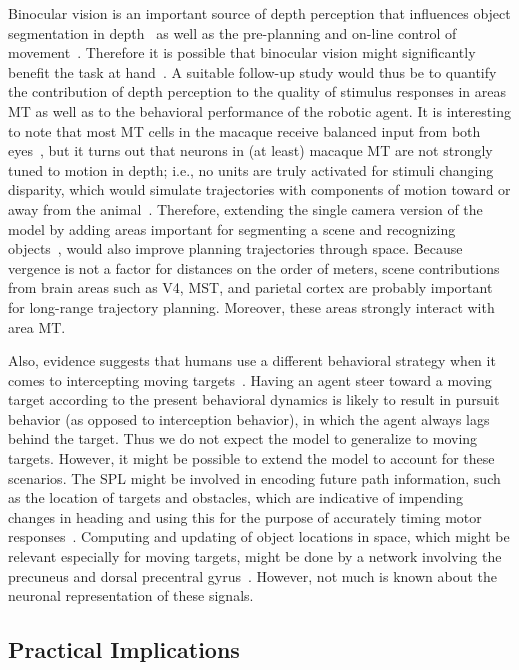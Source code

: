Binocular vision is an important source of depth perception that
influences object segmentation in depth~\citep{Xiao1997}
as well as the pre-planning and on-line control
of movement~\citep{Patla1997}. Therefore it is possible
that binocular vision might significantly benefit the task at 
hand~\citep{Pauwels2010}. A suitable
follow-up study would thus be to quantify the contribution of
depth perception to the quality of stimulus responses in areas
\ac{MT} as well as to the behavioral performance of the robotic agent.
It is interesting to note that most \ac{MT} cells in the macaque
receive balanced input from both eyes~\citep{MaunsellVanEssen1983}, 
but it turns out that neurons in (at least) macaque \ac{MT}
are not strongly tuned to motion in depth; i.e., no units are truly
activated for stimuli changing disparity, which would simulate
trajectories with components of motion toward or away from the
animal~\citep{MaunsellVanEssen1983}. Therefore, extending the
single camera version of the model by adding areas important for
segmenting a scene and recognizing objects~\citep{Baloch1997},
would also improve planning trajectories through space.
Because vergence is not a factor for distances on the order of
meters, scene contributions from brain areas such as V4, \ac{MST}, and
parietal cortex are probably important for long-range trajectory
planning. Moreover, these areas strongly interact with area \ac{MT}.

Also, evidence suggests that humans use a different behavioral
strategy when it comes to intercepting moving 
targets~\citep{FajenWarren2003}.
Having an agent steer toward a moving target
according to the present behavioral dynamics is likely to result in
pursuit behavior (as opposed to interception behavior), in which
the agent always lags behind the target. Thus we do not expect
the model to generalize to moving targets. However, it might
be possible to extend the model to account for these scenarios.
The \ac{SPL} might be involved in encoding
future path information, such as the location of targets and
obstacles, which are indicative of impending changes in heading
and using this for the purpose of accurately timing motor 
responses~\citep{Billington2013,Field2007}. Computing and updating
of object locations in space, which might be relevant especially
for moving targets, might be done by a network involving the
precuneus and dorsal precentral 
gyrus~\citep{Leichnetz2001,Parvizi2006}. However, not much is
known about the neuronal representation of these signals.


\subsection{Practical Implications}
\label{sec:ABR|discussion|practical}

